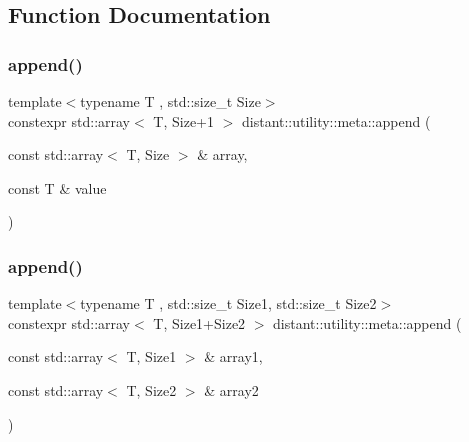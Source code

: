 \subsection{Function Documentation}
\mbox{\label{namespacedistant_1_1utility_1_1meta_a03f70faa19018e00727dfb7c53319bff}} 
\subsubsection{\texorpdfstring{append()}{append()}\hspace{0.1cm}{\footnotesize\ttfamily [1/2]}}
{\footnotesize\ttfamily template$<$typename T , std\+::size\+\_\+t Size$>$ \\
constexpr std\+::array$<$ T, Size+1 $>$ distant\+::utility\+::meta\+::append (\begin{DoxyParamCaption}\item[{const std\+::array$<$ T, Size $>$ \&}]{array,  }\item[{const T \&}]{value }\end{DoxyParamCaption})\hspace{0.3cm}{\ttfamily [noexcept]}}

\mbox{\label{namespacedistant_1_1utility_1_1meta_af906f08f34a3f7c55985df5556b1ce90}} 
\subsubsection{\texorpdfstring{append()}{append()}\hspace{0.1cm}{\footnotesize\ttfamily [2/2]}}
{\footnotesize\ttfamily template$<$typename T , std\+::size\+\_\+t Size1, std\+::size\+\_\+t Size2$>$ \\
constexpr std\+::array$<$ T, Size1+Size2 $>$ distant\+::utility\+::meta\+::append (\begin{DoxyParamCaption}\item[{const std\+::array$<$ T, Size1 $>$ \&}]{array1,  }\item[{const std\+::array$<$ T, Size2 $>$ \&}]{array2 }\end{DoxyParamCaption})\hspace{0.3cm}{\ttfamily [noexcept]}}

